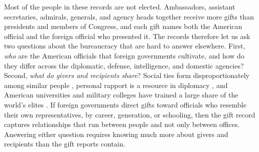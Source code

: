 \documentclass[11pt]{article}
\begin{document}
Most of the people in these records are not elected. Ambassadors, assistant secretaries, admirals, generals, and agency heads together receive more gifts than presidents and members of Congress, and each gift names both the American official and the foreign official who presented it. The records therefore let us ask two questions about the bureaucracy that are hard to answer elsewhere. First, \emph{who} are the American officials that foreign governments cultivate, and how do they differ across the diplomatic, defense, intelligence, and domestic agencies? Second, \emph{what do givers and recipients share}? Social ties form disproportionately among similar people \citep{mcpherson2001birds}, personal rapport is a resource in diplomacy \citep{holmes2013force}, and American universities and military colleges have trained a large share of the world's elites \citep{atkinson2010soft,ruby2010pme,gift2017who}. If foreign governments direct gifts toward officials who resemble their own representatives, by career, generation, or schooling, then the gift record captures relationships that run between people and not only between offices. Answering either question requires knowing much more about givers and recipients than the gift reports contain.
\end{document}
